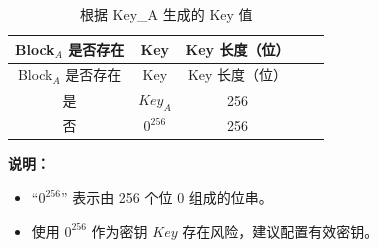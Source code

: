\begin{longtable}[c]{ |c|c|c|c|c| }
\caption{根据 Key\_A 生成的 Key 值}
\label{tab:extmemencr-key-possibility}
\\\hline 
\rowcolor{lightgray}
Block$_A$ 是否存在& Key  & Key 长度（位） \\\hline
\endfirsthead
\hline
\rowcolor{lightgray}
Block$_A$ 是否存在& Key  & Key 长度（位） \\\hline
\endhead
\endfoot
是       &   $\mathit{Key}_{A}$    &   256   \\\hline
否        &   $0^{256}$    &   256   \\\hline
\end{longtable}
\vspace{-1.5em}
{\bfseries 说明：}\\
\begin{itemize}
    \item “$0^{256}$” 表示由 256 个位 0 组成的位串。
    \item 使用 $0^{256}$ 作为密钥 $\mathit{Key}$ 存在风险，建议配置有效密钥。
\end{itemize}